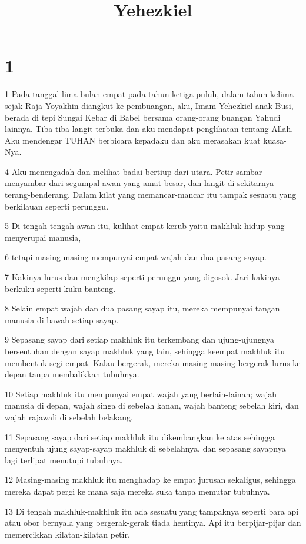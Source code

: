 

\title{Yehezkiel}


\chapter{1}

\par 1 Pada tanggal lima bulan empat pada tahun ketiga puluh, dalam tahun kelima sejak Raja Yoyakhin diangkut ke pembuangan, aku, Imam Yehezkiel anak Busi, berada di tepi Sungai Kebar di Babel bersama orang-orang buangan Yahudi lainnya. Tiba-tiba langit terbuka dan aku mendapat penglihatan tentang Allah. Aku mendengar TUHAN berbicara kepadaku dan aku merasakan kuat kuasa-Nya.
\par 4 Aku menengadah dan melihat badai bertiup dari utara. Petir sambar-menyambar dari segumpal awan yang amat besar, dan langit di sekitarnya terang-benderang. Dalam kilat yang memancar-mancar itu tampak sesuatu yang berkilauan seperti perunggu.
\par 5 Di tengah-tengah awan itu, kulihat empat kerub yaitu makhluk hidup yang menyerupai manusia,
\par 6 tetapi masing-masing mempunyai empat wajah dan dua pasang sayap.
\par 7 Kakinya lurus dan mengkilap seperti perunggu yang digosok. Jari kakinya berkuku seperti kuku banteng.
\par 8 Selain empat wajah dan dua pasang sayap itu, mereka mempunyai tangan manusia di bawah setiap sayap.
\par 9 Sepasang sayap dari setiap makhluk itu terkembang dan ujung-ujungnya bersentuhan dengan sayap makhluk yang lain, sehingga keempat makhluk itu membentuk segi empat. Kalau bergerak, mereka masing-masing bergerak lurus ke depan tanpa membalikkan tubuhnya.
\par 10 Setiap makhluk itu mempunyai empat wajah yang berlain-lainan; wajah manusia di depan, wajah singa di sebelah kanan, wajah banteng sebelah kiri, dan wajah rajawali di sebelah belakang.
\par 11 Sepasang sayap dari setiap makhluk itu dikembangkan ke atas sehingga menyentuh ujung sayap-sayap makhluk di sebelahnya, dan sepasang sayapnya lagi terlipat menutupi tubuhnya.
\par 12 Masing-masing makhluk itu menghadap ke empat jurusan sekaligus, sehingga mereka dapat pergi ke mana saja mereka suka tanpa memutar tubuhnya.
\par 13 Di tengah makhluk-makhluk itu ada sesuatu yang tampaknya seperti bara api atau obor bernyala yang bergerak-gerak tiada hentinya. Api itu berpijar-pijar dan memercikkan kilatan-kilatan petir.
